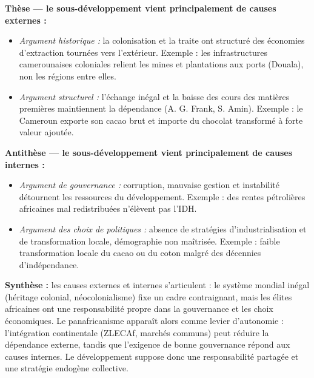 \documentclass[11pt]{article}
\begin{document}
\begin{corrige}
\textbf{Thèse — le sous-développement vient principalement de causes externes :}
\begin{itemize}
\item \emph{Argument historique :} la colonisation et la traite ont structuré des économies d'extraction tournées vers l'extérieur. Exemple : les infrastructures camerounaises coloniales relient les mines et plantations aux ports (Douala), non les régions entre elles.
\item \emph{Argument structurel :} l'échange inégal et la baisse des cours des matières premières maintiennent la dépendance (A. G. Frank, S. Amin). Exemple : le Cameroun exporte son cacao brut et importe du chocolat transformé à forte valeur ajoutée.
\end{itemize}
\textbf{Antithèse — le sous-développement vient principalement de causes internes :}
\begin{itemize}
\item \emph{Argument de gouvernance :} corruption, mauvaise gestion et instabilité détournent les ressources du développement. Exemple : des rentes pétrolières africaines mal redistribuées n'élèvent pas l'IDH.
\item \emph{Argument des choix de politiques :} absence de stratégies d'industrialisation et de transformation locale, démographie non maîtrisée. Exemple : faible transformation locale du cacao ou du coton malgré des décennies d'indépendance.
\end{itemize}
\textbf{Synthèse :} les causes externes et internes s'articulent : le système mondial inégal (héritage colonial, néocolonialisme) fixe un cadre contraignant, mais les élites africaines ont une responsabilité propre dans la gouvernance et les choix économiques. Le panafricanisme apparaît alors comme levier d'autonomie : l'intégration continentale (ZLECAf, marchés communs) peut réduire la dépendance externe, tandis que l'exigence de bonne gouvernance répond aux causes internes. Le développement suppose donc une responsabilité partagée et une stratégie endogène collective.
\end{corrige}
\end{document}
